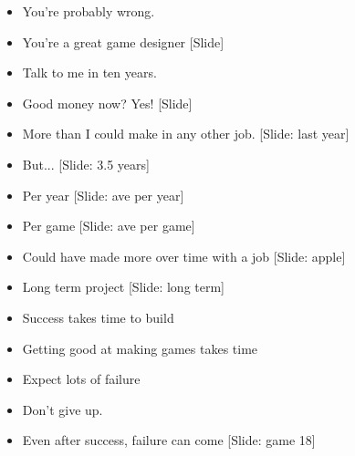 \documentclass[12pt]{article}
\begin{document}
{\begin{itemize}
\item You're probably wrong.

\item You're a great game designer [Slide]

\item Talk to me in ten years.

\item Good money now?  Yes!  [Slide]

\item More than I could make in any other job. [Slide: last year]

\item But... [Slide: 3.5 years]

\item Per year [Slide:  ave per year]

\item Per game [Slide:  ave per game]

\item Could have made more over time with a job [Slide:  apple]

\item Long term project [Slide: long term]

\item Success takes time to build

\item Getting good at making games takes time

\item  Expect lots of failure

\item Don't give up.

\item Even after success, failure can come [Slide: game 18]




\end{itemize}

}
\end{document}
